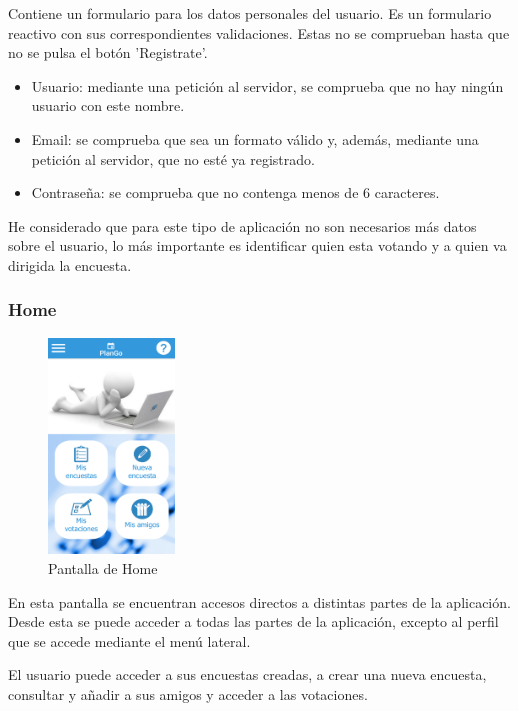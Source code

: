 \documentclass[a4paper, 12pt]{book}
\begin{document}
Contiene un formulario para los datos personales del usuario. Es un formulario reactivo
con sus correspondientes validaciones. Estas no se comprueban hasta que no se pulsa el bot\'on
'Registrate'.

\begin{itemize}
\item Usuario: mediante una petici\'on al servidor, se comprueba que no hay ning\'un usuario con
este nombre.
\item Email: se comprueba que sea un formato v\'alido y, adem\'as, mediante una petici\'on al
servidor, que no est\'e ya registrado.
\item Contrase\~na: se comprueba que no contenga menos de 6 caracteres.

\end{itemize}

He considerado que para este tipo de aplicaci\'on no son necesarios m\'as datos sobre el
usuario, lo m\'as importante es identificar quien esta votando y a quien va dirigida la encuesta.

\subsubsection{Home}
\label{sec:home}

\begin{figure}[H]
  \centering
  \includegraphics[width=0.3\textwidth]{img/home.png}
  \caption{Pantalla de Home}
  \label{figura:home}
\end{figure}

En esta pantalla se encuentran accesos directos a distintas partes de la aplicaci\'on. Desde esta se puede acceder a todas las partes de la aplicaci\'on,
excepto al perfil que se accede mediante el men\'u lateral. 

El usuario puede acceder a sus encuestas creadas, a crear una nueva encuesta, consultar y a\~nadir a sus
amigos y acceder a las votaciones.
\end{document}
